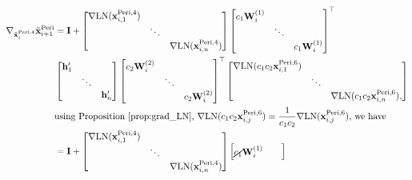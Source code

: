 \documentclass[journal]{IEEEtran}
\newcommand{\bfI}{{\bf I}}
\newcommand{\bfW}{{\bf W}}
\newcommand{\bfh}{{\bf h}}
\newcommand{\bfx}{{\bf x}}
\theoremstyle{plain}
\theoremstyle{definition}
\theoremstyle{remark}
\begin{document}
\begin{align}
   \nabla_{\tilde{\bfx}_i^{{\rm Peri}, 4}} \tilde{\bfx}_{i+1}^{{\rm Peri}} &= \bfI 
   +  \begin{bmatrix}
\nabla {\rm LN}(\bfx^{{\rm Peri}, 4}_{i, 1}) &        &        \\
                 & \ddots &        \\
                 &        & \nabla {\rm LN}(\bfx^{{\rm Peri}, 4}_{i, n})
\end{bmatrix} 
\begin{bmatrix}
c_1\bfW_{i}^{(1)} &        &        \\
                 & \ddots &        \\
                 &        & c_1\bfW_{i}^{(1)}
\end{bmatrix}^\top \\
   & \begin{bmatrix}
\bfh'_1 &        &        \\
                 & \ddots &        \\
                 &        & \bfh'_n
\end{bmatrix}
\begin{bmatrix}
c_2\bfW_{i}^{(2)} &        &        \\
                 & \ddots &        \\
                 &        & c_2\bfW_{i}^{(2)}
\end{bmatrix}^\top \begin{bmatrix}
\nabla {\rm LN}(c_1 c_2 \bfx^{{\rm Peri}, 6}_{i, 1}) &        &        \\
                 & \ddots &        \\
                 &        & \nabla {\rm LN}(c_1 c_2 \bfx^{{\rm Peri}, 6}_{i, n}),
\end{bmatrix} \\
& \text{using Proposition~\ref{prop:grad_LN}, $\nabla {\rm LN}(c_1 c_2 \bfx^{{\rm Peri}, 6}_{i, j})=\frac{1}{c_1 c_2} \nabla {\rm LN}(\bfx^{{\rm Peri}, 6}_{i, j})$, we have} \\
&= \bfI 
   +  \begin{bmatrix}
\nabla {\rm LN}(\bfx^{{\rm Peri}, 4}_{i, 1}) &        &        \\
                 & \ddots &        \\
                 &        & \nabla {\rm LN}(\bfx^{{\rm Peri}, 4}_{i, n})
\end{bmatrix} 
\begin{bmatrix}
\cancel{c_1}\bfW_{i}^{(1)} &        &        \\

\end{bmatrix}
\end{align}
\end{document}
